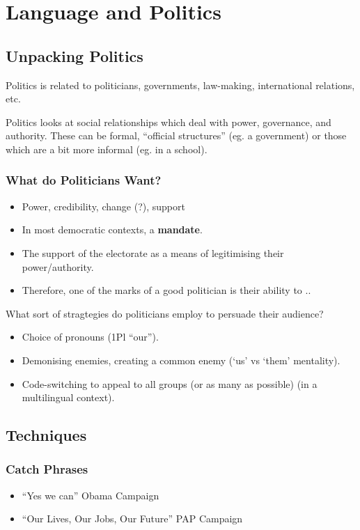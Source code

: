 \documentclass[../main.tex]{subfiles}
\begin{document}
	\section{Language and Politics}
		\subsection{Unpacking Politics}
			Politics is related to politicians, governments, law-making, international relations, etc. \par
			Politics looks at social relationships which deal with power, governance, and authority. These can be formal, ``official structures'' (eg. a government) or those which are a bit more informal (eg. in a school).

			\subsubsection{What do Politicians Want?}
				\begin{itemize}
					\item Power, credibility, change (?), support
					\item In most democratic contexts, a \textbf{mandate}.
					\item The support of the electorate as a means of legitimising their power/authority.
					\item Therefore, one of the marks of a good politician is their ability to ..
				\end{itemize}

				What sort of stragtegies do politicians employ to persuade their audience?
					\begin{itemize}
						\item Choice of pronouns (1Pl ``our'').
						\item Demonising enemies, creating a common enemy (`us' vs `them' mentality).
						\item Code-switching to appeal to all groups (or as many as possible) (in a multilingual context).
					\end{itemize}
		
		\subsection{Techniques}
			\subsubsection{Catch Phrases}
				\begin{itemize}
					\item ``Yes we can'' Obama Campaign
					\item ``Our Lives, Our Jobs, Our Future'' PAP Campaign
				\end{itemize}
				
\end{document}
